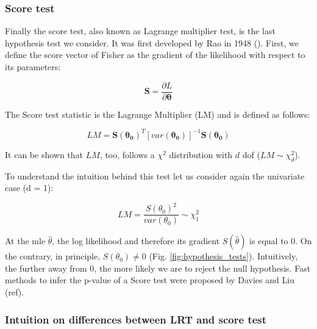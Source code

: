 \subsubsection{Score test}

Finally the score test, also known as Lagrange multiplier test, is the last hypothesis test we consider. 
It was first developed by Rao in 1948 (\cite{rao1948large}).
First, we define the score vector of Fisher as the gradient of the likelihood with respect to its parameters:

\begin{equation}\label{eq:score_vector}
    \mathbf{S} = \frac{\partial L}{\partial \boldsymbol{\theta}}
\end{equation}

The Score test statistic is the Lagrange Multiplier (LM) and is defined as follows:

\begin{equation}\label{eq:lagrange_multiplier}
    LM = \mathbf{S}(\boldsymbol{\theta_0})^T [var(\boldsymbol{\theta_0})]^{-1}\mathbf{S}(\boldsymbol{\theta_0}) 
\end{equation}

It can be shown that $LM$, too, follows a $\chi^2$ distribution with $d$ dof ($LM \sim \chi^2_d$).

To understand the intuition behind this test let us consider again the univariate case (d = 1):

\begin{equation}\label{eq:lagrange_multiplier_univariate}
    LM = \frac{S(\theta_0)^2}{var(\theta_0)} \sim \chi^2_1
\end{equation}

At the \gls{mle} $\hat{\theta}$, the log likelihood and therefore its gradient $S(\hat{\theta})$ is equal to 0.
On the contrary, in principle, $ S(\theta_0) \neq 0 $ (Fig. \ref{fig:hypothesis_tests}). 
Intuitively, the further away from 0, the more likely we are to reject the null hypothesis.
Fast methods to infer the p-value of a Score test were proposed by Davies  \cite{davies1980algorithm} and Liu (ref).



\subsubsection{Intuition on differences between LRT and score test}

